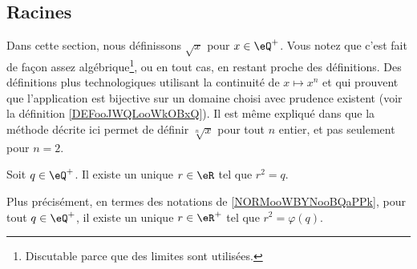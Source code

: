 \subsection{Racines}
\label{SUBSECooMBCNooEqjjTY}

Dans cette section, nous définissons \( \sqrt{ x }\) pour \( x\in\eQ^+\). Vous notez que c'est fait de façon assez algébrique\footnote{Discutable parce que des limites sont utilisées.}, ou en tout cas, en restant proche des définitions. Des définitions plus technologiques utilisant la continuité de \( x\mapsto x^n\) et qui prouvent que l'application est bijective sur un domaine choisi avec prudence existent (voir la définition \ref{DEFooJWQLooWkOBxQ}). Il est même expliqué dans \cite{BIBooMPXEooQLKhku} que la méthode décrite ici permet de définir \( \sqrt[n]{ x }\) pour tout \( n\) entier, et pas seulement pour \( n=2\).

\begin{proposition}     \label{PROPooUHKFooVKmpte}
	Soit \( q\in \eQ^+\). Il existe un unique \( r\in \eR\) tel que \( r^2=q\).

	Plus précisément, en termes des notations de \ref{NORMooWBYNooBQaPPk}, pour tout \( q\in \eQ^+\), il existe un unique \( r\in \eR^+\) tel que \( r^2=\varphi(q)\).
\end{proposition}

